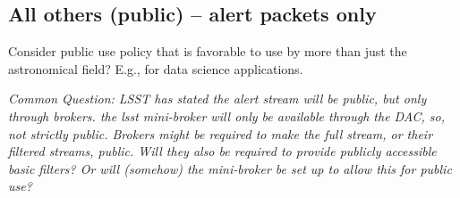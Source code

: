 
\subsection{All others (public) -- alert packets only}


Consider public use policy that is favorable to use by more than just the astronomical field? E.g., for data science applications.

{\it Common Question: LSST has stated the alert stream will be public, but only through brokers. the lsst mini-broker will only be available through the DAC, so, not strictly public. Brokers might be required to make the full stream, or their filtered streams, public. Will they also be required to provide publicly accessible basic filters? Or will (somehow) the mini-broker be set up to allow this for public use?}